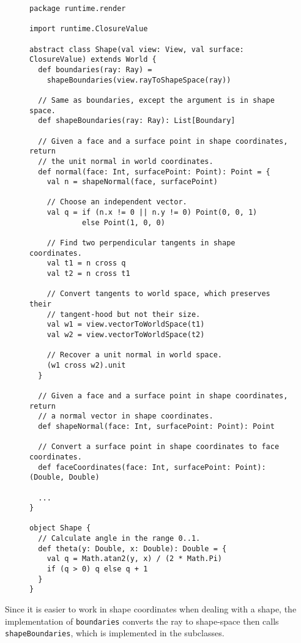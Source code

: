 \begin{figure}
\begin{verbatim}
package runtime.render

import runtime.ClosureValue

abstract class Shape(val view: View, val surface: ClosureValue) extends World {
  def boundaries(ray: Ray) =
    shapeBoundaries(view.rayToShapeSpace(ray))

  // Same as boundaries, except the argument is in shape space.
  def shapeBoundaries(ray: Ray): List[Boundary]

  // Given a face and a surface point in shape coordinates, return
  // the unit normal in world coordinates.
  def normal(face: Int, surfacePoint: Point): Point = {
    val n = shapeNormal(face, surfacePoint)

    // Choose an independent vector.
    val q = if (n.x != 0 || n.y != 0) Point(0, 0, 1)
            else Point(1, 0, 0)

    // Find two perpendicular tangents in shape coordinates.
    val t1 = n cross q
    val t2 = n cross t1

    // Convert tangents to world space, which preserves their
    // tangent-hood but not their size.
    val w1 = view.vectorToWorldSpace(t1)
    val w2 = view.vectorToWorldSpace(t2)

    // Recover a unit normal in world space.
    (w1 cross w2).unit
  }

  // Given a face and a surface point in shape coordinates, return
  // a normal vector in shape coordinates.
  def shapeNormal(face: Int, surfacePoint: Point): Point

  // Convert a surface point in shape coordinates to face coordinates.
  def faceCoordinates(face: Int, surfacePoint: Point): (Double, Double)

  ...
}

object Shape {
  // Calculate angle in the range 0..1.
  def theta(y: Double, x: Double): Double = {
    val q = Math.atan2(y, x) / (2 * Math.Pi)
    if (q > 0) q else q + 1
  }  
}
\end{verbatim}
\getcaption
\end{figure}

Since it is easier to work in shape coordinates when dealing with a shape,
the implementation of \verb!boundaries! converts the ray to shape-space
then calls \verb!shapeBoundaries!, which is implemented in the subclasses.

